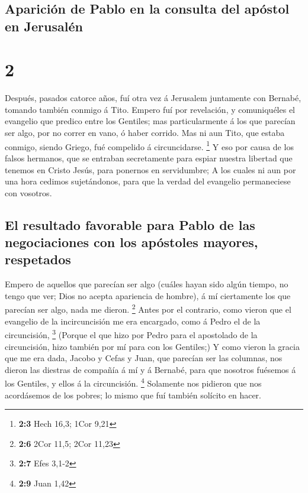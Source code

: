 \hypertarget{apariciuxf3n-de-pablo-en-la-consulta-del-apuxf3stol-en-jerusaluxe9n}{%
\subsection{Aparición de Pablo en la consulta del apóstol en
Jerusalén}\label{apariciuxf3n-de-pablo-en-la-consulta-del-apuxf3stol-en-jerusaluxe9n}}

\hypertarget{section-1}{%
\section{2}\label{section-1}}

 Después, pasados catorce años, fuí otra vez á Jerusalem
juntamente con Bernabé, tomando también conmigo á Tito. 
Empero fuí por revelación, y comuniquéles el evangelio que predico entre
los Gentiles; mas particularmente á los que parecían ser algo, por no
correr en vano, ó haber corrido.  Mas ni aun Tito, que
estaba conmigo, siendo Griego, fué compelido á circuncidarse.
\footnote{\textbf{2:3} Hech 16,3; 1Cor 9,21}  Y eso por
causa de los falsos hermanos, que se entraban secretamente para espiar
nuestra libertad que tenemos en Cristo Jesús, para ponernos en
servidumbre;  A los cuales ni aun por una hora cedimos
sujetándonos, para que la verdad del evangelio permaneciese con
vosotros.

\hypertarget{el-resultado-favorable-para-pablo-de-las-negociaciones-con-los-apuxf3stoles-mayores-respetados}{%
\subsection{El resultado favorable para Pablo de las negociaciones con
los apóstoles mayores,
respetados}\label{el-resultado-favorable-para-pablo-de-las-negociaciones-con-los-apuxf3stoles-mayores-respetados}}

 Empero de aquellos que parecían ser algo (cuáles hayan sido
algún tiempo, no tengo que ver; Dios no acepta apariencia de hombre), á
mí ciertamente los que parecían ser algo, nada me dieron. \footnote{\textbf{2:6}
  2Cor 11,5; 2Cor 11,23}  Antes por el contrario, como
vieron que el evangelio de la incircuncisión me era encargado, como á
Pedro el de la circuncisión, \footnote{\textbf{2:7} Efes 3,1-2}
 (Porque el que hizo por Pedro para el apostolado de la
circuncisión, hizo también por mí para con los Gentiles;)  Y
como vieron la gracia que me era dada, Jacobo y Cefas y Juan, que
parecían ser las columnas, nos dieron las diestras de compañía á mí y á
Bernabé, para que nosotros fuésemos á los Gentiles, y ellos á la
circuncisión. \footnote{\textbf{2:9} Juan 1,42}  Solamente
nos pidieron que nos acordásemos de los pobres; lo mismo que fuí también
solícito en hacer.

